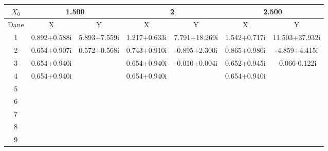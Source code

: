 \documentclass[a4paper, 11pt]{article}
\begin{document}
\begin{enumerate}
\begin{itemize}
\begin{table}[p]
\centering                                                                                           


\hspace*{-2cm}\begin{tabular}{|c|c|c|c|c|c|c|}                                                                     
\hline                                                                                               
\( X_0 \)  & \multicolumn{2}{c|}{1.500} & \multicolumn{2}{c|}{2  } & \multicolumn{2}{c|}{2.500}\\                                            
\hline                                                                                               
Dane & X & Y & X & Y & X & Y \\                                                                     
\hline                                                                                               
1  & 0.892+0.588i & 5.893+7.559i & 1.217+0.633i & 7.791+18.269i & 1.542+0.717i & 11.503+37.932i \\
\hline                                                                                               
2  & 0.654+0.907i & 0.572+0.568i & 0.743+0.910i & -0.895+2.300i & 0.865+0.980i & -4.859+4.415i \\ 
\hline                                                                                               
3  & 0.654+0.940i &  & 0.654+0.940i & -0.010+0.004i & 0.652+0.945i & -0.066-0.122i \\ 
\hline                                                                                               
4  & 0.654+0.940i &   & 0.654+0.940i &  & 0.654+0.940i &  \\  
\hline                                                                                               
5  &  &  &  &  &  &  \\                                             
\hline                                                                                               
6  &  &  &  &  &  &  \\                                             
\hline                                                                                               
7  &  &  &  &  &  &  \\                                             
\hline                                                                                               
8  &  &  &  &  &  &  \\                                             
\hline                                                                                               
9  &  &  &  &  &  &  \\                                             
\hline                                                                                               
\end{tabular}                                                                                        



\end{table}
\end{itemize}
\end{enumerate}
\end{document}
